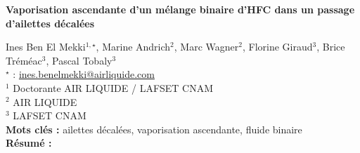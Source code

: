 


    \newpage


%
\begin{flushleft}
\addtocounter{section}{1}
{\Large \textbf{Vaporisation ascendante d'un mélange binaire d'HFC dans un passage d'ailettes décalées}}\label{ref:12}
\end{flushleft}
%
Ines Ben El Mekki$^{1,\star}$, Marine Andrich$^{2}$, Marc Wagner$^{2}$, Florine Giraud$^{3}$, Brice Tréméac$^{3}$, Pascal Tobaly$^{3}$\\[2mm]
$^{\star}$ \Letter : \url{ines.benelmekki@airliquide.com}\\[2mm]
{\footnotesize $^{1}$ Doctorante AIR LIQUIDE / LAFSET CNAM}\\
{\footnotesize $^{2}$ AIR LIQUIDE}\\
{\footnotesize $^{3}$ LAFSET CNAM}\\
[4mm]
%
\noindent \textbf{Mots clés : } ailettes décalées, vaporisation ascendante, fluide binaire\\[4mm]
%
\noindent \textbf{Résumé : } 

